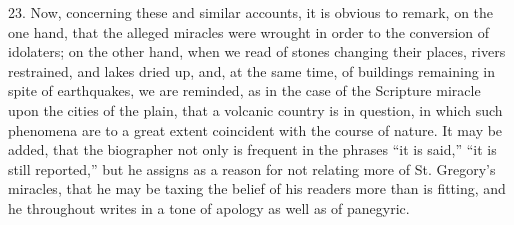 23.
Now, concerning these and similar accounts, it is obvious to remark,
on the one hand, that the alleged miracles were wrought in order to
the conversion of idolaters; on the other hand, when we read of stones
changing their places, rivers restrained, and lakes dried up,
and, at the same time, of buildings remaining in spite of earthquakes,
we are reminded, as in the case of the Scripture miracle upon the
cities of the plain, that a volcanic country is in question, in which
such phenomena are to a great extent coincident with the course of
nature. It may be added, that the biographer not only is frequent in
the phrases ``it is said,'' ``it is still reported,'' but he assigns
as a reason for not relating more of St. Gregory's miracles, that he
may be taxing the belief of his readers more than is fitting, and he
throughout writes in a tone of apology as well as of panegyric.

